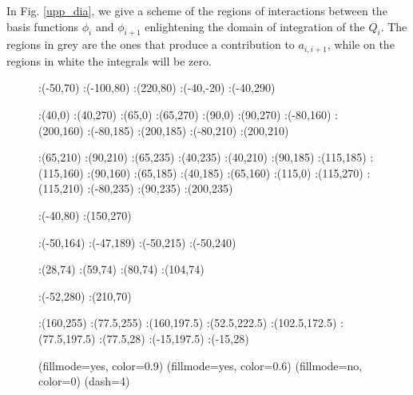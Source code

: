 {In Fig. \ref{upp_dia}, we give a scheme of the regions of interactions between the basis functions $\phi_i$ and $\phi_{i+1}$ enlightening the domain of integration of the $Q_i$. The regions in grey are the ones that produce a contribution to $a_{i,i+1}$, while on the regions in white the integrals will be zero.
\begin{figure}[h]
\figinit{0.7pt}
:(-50,70)
:(-100,80) :(220,80)
:(-40,-20) :(-40,290)

:(40,0) :(40,270)
:(65,0) :(65,270)
:(90,0) :(90,270)
%
:(-80,160) :(200,160)
:(-80,185) :(200,185)
:(-80,210) :(200,210)
%

:(65,210) :(90,210)
:(65,235) :(40,235) 
:(40,210) :(90,185)
:(115,185) :(115,160)
:(90,160) :(65,185)
:(40,185) :(65,160) 
:(115,0) :(115,270) 
:(115,210) :(-80,235) 
:(90,235) :(200,235) 

:(-40,80) :(150,270)

:(-50,164) :(-47,189) 
:(-50,215) :(-50,240) 

:(28,74) :(59,74) 
:(80,74) :(104,74) 

:(-52,280) :(210,70)

:(160,255) :(77.5,255)
:(160,197.5) :(52.5,222.5)
:(102.5,172.5) :(77.5,197.5)
:(77.5,28) :(-15,197.5)
:(-15,28) 


\figdrawbegin{}

\figset(fillmode=yes, color=0.9)
\figdrawline[29,30,10,8,29]
\figdrawline[29,31,32,33,29]
\figdrawline[30,34,14,16,30]
\figdrawline[35,36,37,34,35]
\figdrawline[34,38,7,9,34]
\figdrawline[38,29,15,13,38]
\figset(fillmode=yes, color=0.6)
\figdrawline[29,30,34,38,29]
\figset(fillmode=no, color=0)
\figdrawarrow[1,2]
\figdrawarrow[3,4]
\figdrawline[8,31]
\figdrawline[10,30]
\figdrawline[30,16]
\figdrawline[35,14]
\figdrawline[35,36]
\figdrawline[36,37]
\figdrawline[37,9]
\figdrawline[38,7]
\figdrawline[38,13]
\figdrawline[33,15]
\figdrawline[32,33]
\figdrawline[32,31]
\figset(dash=4)
\figdrawline[6,32]
\figdrawline[39,5]
\figdrawline[40,11]
\figdrawline[36,12]
\figdrawline[36,41]
\figdrawline[42,43]
\figdrawline[32,44]
\figdrawline[45,46]


\end{figure}}
